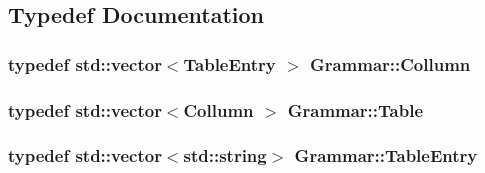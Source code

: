 \subsection{\-Typedef \-Documentation}
\hypertarget{namespaceGrammar_ab0ca0e61019c21f20260968164e53945}{
\subsubsection[{\-Collumn}]{\setlength{\rightskip}{0pt plus 5cm}typedef std\-::vector$<${\bf \-Table\-Entry} $>$ {\bf \-Grammar\-::\-Collumn}}}\label{d0/da6/namespaceGrammar_ab0ca0e61019c21f20260968164e53945}
\hypertarget{namespaceGrammar_ac36a2ef8f0596f29dde458d3d9917e88}{
\subsubsection[{\-Table}]{\setlength{\rightskip}{0pt plus 5cm}typedef std\-::vector$<${\bf \-Collumn} $>$ {\bf \-Grammar\-::\-Table}}}\label{d0/da6/namespaceGrammar_ac36a2ef8f0596f29dde458d3d9917e88}
\hypertarget{namespaceGrammar_a1d9fbc78aa4b224969964f71642a1e62}{
\subsubsection[{\-Table\-Entry}]{\setlength{\rightskip}{0pt plus 5cm}typedef std\-::vector$<$std\-::string$>$ {\bf \-Grammar\-::\-Table\-Entry}}}\label{d0/da6/namespaceGrammar_a1d9fbc78aa4b224969964f71642a1e62}
